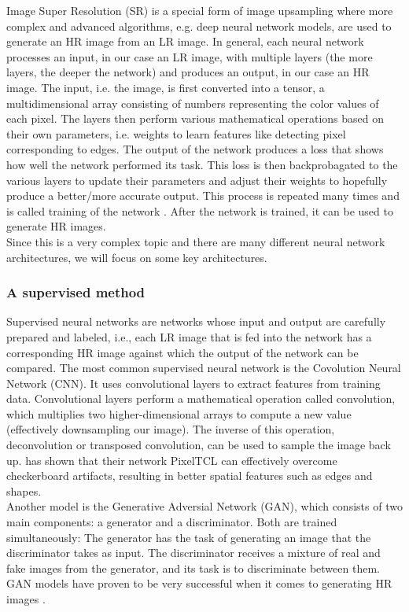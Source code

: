 \documentclass[letterpaper, 10 pt, conference]{ieeeconf}  %
\begin{document}
Image Super Resolution (SR) is a special form of image upsampling where more complex and advanced algorithms, e.g. deep neural network models, are used to generate an HR image from an LR image. 
In general, each neural network processes an input, in our case an LR image, with multiple layers (the more layers, the deeper the network) and produces an output, in our case an HR image.
The input, i.e. the image, is first converted into a tensor, a multidimensional array consisting of numbers representing the color values of each pixel. 
The layers then perform various mathematical operations based on their own parameters, i.e. weights to learn features like detecting pixel corresponding to edges.
The output of the network produces a loss that shows how well the network performed its task. 
This loss is then backprobagated to the various layers to update their parameters and adjust their weights to hopefully produce a better/more accurate output.
This process is repeated many times and is called training of the network \cite{goodfellow2016deep}.
After the network is trained, it can be used to generate HR images.\\
Since this is a very complex topic and there are many different neural network architectures, we will focus on some key architectures.

\subsubsection{A supervised method}
Supervised neural networks are networks whose input and output are carefully prepared and labeled, 
i.e., each LR image that is fed into the network has a corresponding HR image against which the output of the network can be compared.
The most common supervised neural network is the Covolution Neural Network (CNN).
It uses convolutional layers to extract features from training data. 
Convolutional layers perform a mathematical operation called convolution, which multiplies two higher-dimensional arrays to compute a new value (effectively downsampling our image).
The inverse of this operation, deconvolution or transposed convolution, can be used to sample the image back up.
\textcite{Gao2020PixelTC} has shown that their network PixelTCL can effectively overcome checkerboard artifacts, resulting in better spatial features such as edges and shapes.
\\
Another model is the Generative Adversial Network (GAN), which consists of two main components: a generator and a discriminator.
Both are trained simultaneously: 
The generator has the task of generating an image that the discriminator takes as input.
The discriminator receives a mixture of real and fake images from the generator, and its task is to discriminate between them.
GAN models have proven to be very successful when it comes to generating HR images \cite{Sharma2020HighresolutionID}.
\end{document}
